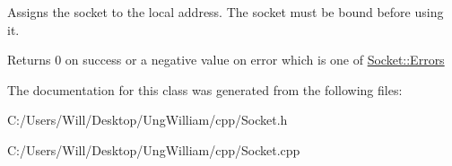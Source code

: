 Assigns the socket to the local address. The socket must be bound before using it. 

\begin{DoxyReturn}{Returns}
0 on success or a negative value on error which is one of \hyperlink{class_socket_a9f68308228badcdd299cd83e62e36976}{Socket\+::\+Errors} 
\end{DoxyReturn}


The documentation for this class was generated from the following files\+:\begin{DoxyCompactItemize}
\item 
C\+:/\+Users/\+Will/\+Desktop/\+Ung\+William/cpp/Socket.\+h\item 
C\+:/\+Users/\+Will/\+Desktop/\+Ung\+William/cpp/Socket.\+cpp\end{DoxyCompactItemize}
